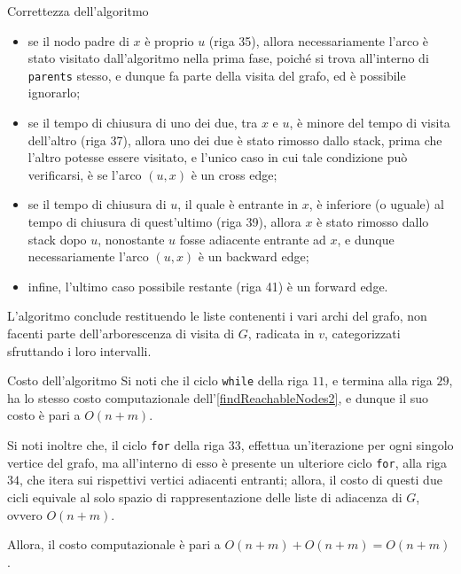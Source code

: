 \documentclass[a4paper, 12pt]{report}
\begin{document}
\begin{framedobs}{Correttezza dell'algoritmo}
        \begin{itemize}
            \item se il nodo padre di $x$ è proprio $u$ (riga 35), allora necessariamente l'arco è stato visitato dall'algoritmo nella prima fase, poiché si trova all'interno di \texttt{parents} stesso, e dunque fa parte della visita del grafo, ed è possibile ignorarlo;
            \item se il tempo di chiusura di uno dei due, tra $x$ e $u$, è minore del tempo di visita dell'altro (riga 37), allora uno dei due è stato rimosso dallo stack, prima che l'altro potesse essere visitato, e l'unico caso in cui tale condizione può verificarsi, è se l'arco $(u, x)$ è un cross edge;
            \item se il tempo di chiusura di $u$, il quale è entrante in $x$, è inferiore (o uguale) al tempo di chiusura di quest'ultimo (riga 39), allora $x$ è stato rimosso dallo stack dopo $u$, nonostante $u$ fosse adiacente entrante ad $x$, e dunque necessariamente l'arco $(u, x)$ è un backward edge;
            \item infine, l'ultimo caso possibile restante (riga 41) è un forward edge.
        \end{itemize}

        L'algoritmo conclude restituendo le liste contenenti i vari archi del grafo, non facenti parte dell'arborescenza di visita di $G$, radicata in $v$, categorizzati sfruttando i loro intervalli.
    \end{framedobs}

    \begin{framedobs}{Costo dell'algoritmo}
        Si noti che il ciclo \texttt{while} della riga $11$, e termina alla riga $29$, ha lo stesso costo computazionale dell'\cref{findReachableNodes2}, e dunque il suo costo è pari a $O(n + m)$.

        Si noti inoltre che, il ciclo \texttt{for} della riga $33$, effettua un'iterazione per ogni singolo vertice del grafo, ma all'interno di esso è presente un ulteriore ciclo \texttt{for}, alla riga $34$, che itera sui rispettivi vertici adiacenti entranti; allora, il costo di questi due cicli equivale al solo spazio di rappresentazione delle liste di adiacenza di $G$, ovvero $O(n + m)$.

        Allora, il costo computazionale è pari a $O(n + m) + O(n + m) = O(n + m)$.
    \end{framedobs}
\end{document}
